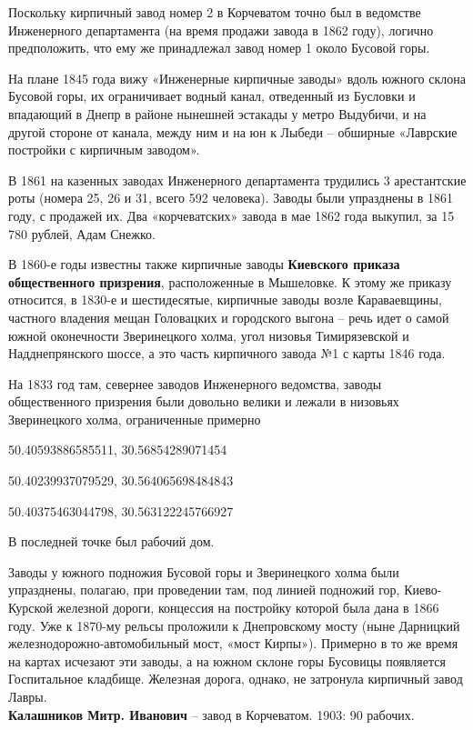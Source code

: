 Поскольку кирпичный завод номер 2 в Корчеватом точно был в ведомстве Инженерного департамента (на время продажи завода в 1862 году), логично предположить, что ему же принадлежал завод номер 1 около Бусовой горы.

На плане 1845 года вижу «Инженерные кирпичные заводы» вдоль южного склона Бусовой горы, их ограничивает водный канал, отведенный из Бусловки и впадающий в Днепр в районе нынешней эстакады у метро Выдубичи, и на другой стороне от канала, между ним и на юн к Лыбеди – обширные «Лаврские постройки с кирпичным заводом».

В 1861 на казенных заводах Инженерного департамента трудились 3 арестантские роты (номера 25, 26 и 31, всего 592 человека). Заводы были упразднены в 1861 году, с продажей их. Два «корчеватских» завода в мае 1862 года выкупил, за 15 780 рублей, Адам Снежко.

В 1860-е годы известны также кирпичные заводы \textbf{Киевского приказа общественного призрения}, расположенные в Мышеловке. К этому же приказу относится, в 1830-е и шестидесятые, кирпичные заводы возле Караваевщины, частного владения мещан Головацких и городского выгона – речь идет о самой южной оконечности Зверинецкого холма, угол низовья Тимирязевской и Надднепрянского шоссе, а это часть кирпичного завода №1 с карты 1846 года.

На 1833 год там, севернее заводов Инженерного ведомства, заводы общественного призрения были довольно велики и лежали в низовьях Зверинецкого холма, ограниченные примерно 

50.40593886585511, 30.56854289071454

50.40239937079529, 30.564065698484843

50.40375463044798, 30.563122245766927

В последней точке был рабочий дом.

Заводы у южного подножия Бусовой горы и Зверинецкого холма были упразднены, полагаю, при проведении там, под линией подножий гор, Киево-Курской железной дороги, концессия на постройку которой была дана в 1866 году. Уже к 1870-му рельсы проложили к Днепровскому мосту (ныне Дарницкий железнодорожно-автомобильный мост, «мост Кирпы»). Примерно в то же время на картах исчезают эти заводы, а на южном склоне горы Бусовицы появляется Госпитальное кладбище. Железная дорога, однако, не затронула кирпичный завод Лавры.\\

\noindent\textbf{Калашников Митр. Иванович} – завод в Корчеватом. 1903: 90 рабочих.\\

